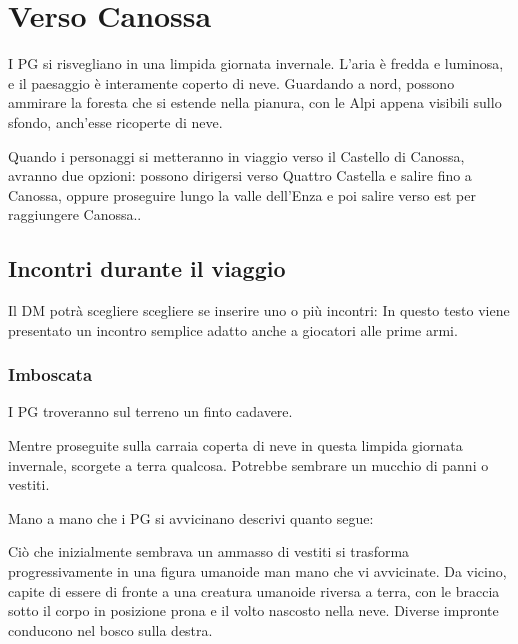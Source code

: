 \documentclass[letterpaper,twocolumn,openany,nodeprecatedcode]{dndbook}
\begin{document}
\chapter{Verso Canossa}
 I PG si risvegliano in una limpida giornata invernale. L'aria è fredda e luminosa, e il paesaggio è interamente coperto di neve. Guardando a nord, possono ammirare la foresta che si estende nella pianura, con le Alpi appena visibili sullo sfondo, anch'esse ricoperte di neve.

Quando i personaggi si metteranno in viaggio verso il Castello di Canossa, avranno due opzioni: possono dirigersi verso Quattro Castella e salire fino a Canossa, oppure proseguire lungo la valle dell'Enza e poi salire verso est per raggiungere Canossa..

\section{Incontri durante il viaggio}
Il DM potrà scegliere scegliere se inserire uno o più incontri: In questo testo viene presentato un incontro semplice adatto anche a giocatori alle prime armi.

\subsection{Imboscata}
I PG troveranno sul terreno un finto cadavere.

\begin{DndReadAloud}
Mentre proseguite sulla carraia coperta di neve in questa limpida giornata invernale, scorgete a terra qualcosa. Potrebbe sembrare un mucchio di panni o vestiti.
\end{DndReadAloud}

Mano a mano che i PG si avvicinano descrivi quanto segue:

\begin{DndReadAloud}
Ciò che inizialmente sembrava un ammasso di vestiti si trasforma progressivamente in una figura umanoide man mano che vi avvicinate. Da vicino, capite di essere di fronte a una creatura umanoide riversa a terra, con le braccia sotto il corpo in posizione prona e il volto nascosto nella neve. Diverse impronte conducono nel bosco sulla destra.
\end{DndReadAloud}
\end{document}
